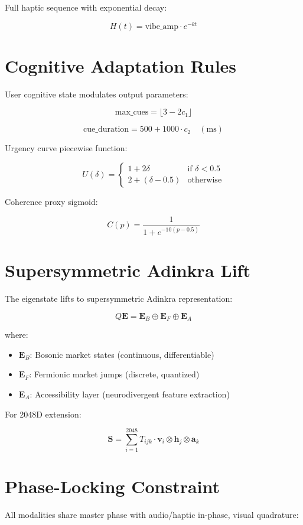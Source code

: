 \documentclass[11pt,a4paper]{article}
\begin{document}
Full haptic sequence with exponential decay:

$$
H(t) = \text{vibe\_amp} \cdot e^{-k t}
$$

\section{Cognitive Adaptation Rules}
User cognitive state modulates output parameters:

$$
\text{max\_cues} = \lfloor 3 - 2c_1 \rfloor
$$

$$
\text{cue\_duration} = 500 + 1000 \cdot c_2 \quad (\text{ms})
$$

Urgency curve piecewise function:

$$
U(\delta) = \begin{cases} 
1 + 2\delta & \text{if } \delta < 0.5 \\
2 + (\delta - 0.5) & \text{otherwise}
\end{cases}
$$

Coherence proxy sigmoid:

$$
C(p) = \frac{1}{1 + e^{-10(p - 0.5)}}
$$

\section{Supersymmetric Adinkra Lift}
The eigenstate lifts to supersymmetric Adinkra representation:

$$
Q \mathbf{E} = \mathbf{E}_B \oplus \mathbf{E}_F \oplus \mathbf{E}_A
$$

where:
\begin{itemize}
\item $\mathbf{E}_B$: Bosonic market states (continuous, differentiable)
\item $\mathbf{E}_F$: Fermionic market jumps (discrete, quantized)
\item $\mathbf{E}_A$: Accessibility layer (neurodivergent feature extraction)
\end{itemize}

For 2048D extension:

$$
\mathbf{S} = \sum_{i=1}^{2048} T_{ijk} \cdot \mathbf{v}_i \otimes \mathbf{h}_j \otimes \mathbf{a}_k
$$

\section{Phase-Locking Constraint}
All modalities share master phase with audio/haptic in-phase, visual quadrature:
\end{document}
